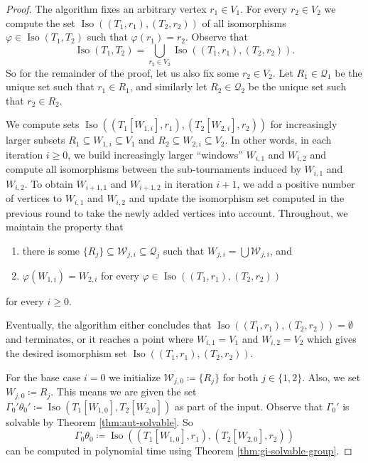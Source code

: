 \PassOptionsToPackage{dvipsnames,svgnames}{xcolor}\documentclass[10pt,a4paper]{article}
\newcommand{\CQ}{{\mathcal Q}}
\newcommand{\CW}{{\mathcal W}}
\DeclareMathOperator{\Iso}{Iso}
\begin{document}
\begin{proof}
 The algorithm fixes an arbitrary vertex $r_1 \in V_1$.
 For every $r_2 \in V_2$ we compute the set $\Iso((T_1,r_1),(T_2,r_2))$ of all isomorphisms $\varphi \in \Iso(T_1,T_2)$ such that $\varphi(r_1) = r_2$.
 Observe that
 \[\Iso(T_1,T_2) = \bigcup_{r_2 \in V_2} \Iso((T_1,r_1),(T_2,r_2)).\]
 So for the remainder of the proof, let us also fix some $r_2 \in V_2$.
 Let $R_1 \in \CQ_1$ be the unique set such that $r_1 \in R_1$, and similarly let $R_2 \in \CQ_2$ be the unique set such that $r_2 \in R_2$.

 We compute sets $\Iso((T_1[W_{1,i}],r_1),(T_2[W_{2,i}],r_2))$ for increasingly larger subsets $R_1 \subseteq W_{1,i} \subseteq V_1$ and $R_2 \subseteq W_{2,i} \subseteq V_2$.
 In other words, in each iteration $i \geq 0$, we build increasingly larger ``windows'' $W_{i,1}$ and $W_{i,2}$ and compute all isomorphisms between the sub-tournaments induced by $W_{i,1}$ and $W_{i,2}$.
 To obtain $W_{i+1,1}$ and $W_{i+1,2}$ in iteration $i+1$, we add a positive number of vertices to $W_{i,1}$ and $W_{i,2}$ and update the isomorphism set computed in the previous round to take the newly added vertices into account.
 Throughout, we maintain the property that
 \begin{enumerate}[label = (I.\arabic*),leftmargin=*]
  \item\label{item:invariant-1} there is some $\{R_j\} \subseteq \CW_{j,i} \subseteq \CQ_j$ such that $W_{j,i} = \bigcup \CW_{j,i}$, and
  \item\label{item:invariant-2} $\varphi(W_{1,i}) = W_{2,i}$ for every $\varphi \in \Iso((T_1,r_1),(T_2,r_2))$
 \end{enumerate}
 for every $i \geq 0$.

 Eventually, the algorithm either concludes that $\Iso((T_1,r_1),(T_2,r_2)) = \emptyset$ and terminates, or it reaches a point where $W_{i,1} = V_1$ and $W_{i,2} = V_2$ which gives the desired isomorphism set $\Iso((T_1,r_1),(T_2,r_2))$.

 For the base case $i = 0$ we initialize $\CW_{j,0} \coloneqq \{R_j\}$ for both $j \in \{1,2\}$.
 Also, we set $W_{j,0} \coloneqq R_j$.
 This means we are given the set $\Gamma_0'\theta_0' \coloneqq \Iso(T_1[W_{1,0}],T_2[W_{2,0}])$ as part of the input.
 Observe that $\Gamma_0'$ is solvable by Theorem \ref{thm:aut-solvable}.
 So
 \[\Gamma_0\theta_0 \coloneqq \Iso((T_1[W_{1,0}],r_1),(T_2[W_{2,0}],r_2))\]
 can be computed in polynomial time using Theorem \ref{thm:gi-solvable-group}.


\end{proof}
\end{document}
